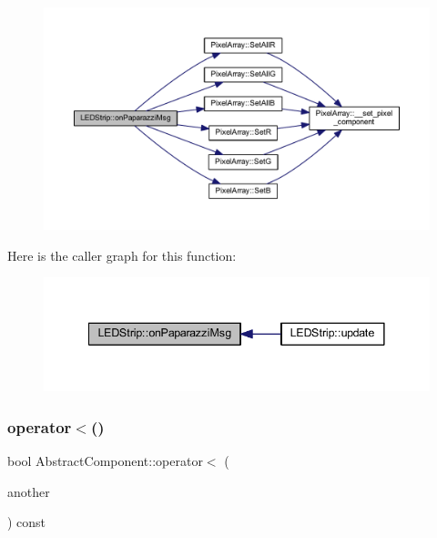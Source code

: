 \begin{figure}[H]
\begin{center}
\leavevmode
\includegraphics[width=350pt]{class_l_e_d_strip_af9708cc14c0e3f75e5b3c268b398f436_cgraph}
\end{center}
\end{figure}
Here is the caller graph for this function\+:\nopagebreak
\begin{figure}[H]
\begin{center}
\leavevmode
\includegraphics[width=341pt]{class_l_e_d_strip_af9708cc14c0e3f75e5b3c268b398f436_icgraph}
\end{center}
\end{figure}
\mbox{\label{class_abstract_component_a0c2e458144111c5f599c66f168516abc}} 
\subsubsection{\texorpdfstring{operator$<$()}{operator<()}}
{\footnotesize\ttfamily bool Abstract\+Component\+::operator$<$ (\begin{DoxyParamCaption}\item[{const \hyperlink{class_abstract_component}{Abstract\+Component} \&}]{another }\end{DoxyParamCaption}) const\hspace{0.3cm}{\ttfamily [inherited]}}



